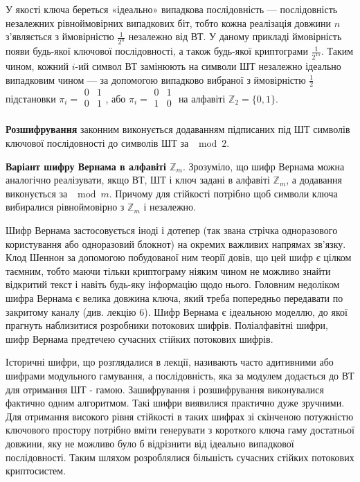 У якості ключа береться «ідеально» випадкова послідовність ---
послідовність незалежних рівноймовірних випадкових біт, тобто кожна
реалізація довжини $n$ з'являється з ймовірністю $\frac{1}{2^n}$ незалежно від ВТ. У
даному прикладі ймовірність появи будь-якої ключової послідовності, а
також будь-якої криптограми $\frac{1}{2^{15}}$. Таким чином, кожний $i$-ий символ ВТ
замінюють на символи ШТ незалежно ідеально випадковим чином --- за
допомогою випадково вибраної з ймовірністю $\frac{1}{2}$ підстановки
$\pi_i = \begin{matrix}
    0 & 1 \\
    0 & 1 \\
\end{matrix}$, або $\pi_i = \begin{matrix}
    0 & 1 \\
    1 & 0 \\
\end{matrix}$ на алфавіті $\mathbb{Z}_2 = \{ 0, 1\}$.

\textbf{Розшифрування} законним виконується додаванням підписаних під ШТ
символів ключової послідовності до символів ШТ за $\mod 2$.

\textbf{Варіант шифру Вернама в алфавіті $\mathbb{Z}_m$}. Зрозуміло, що шифр Вернама
можна аналогічно реалізувати, якщо ВТ, ШТ і ключ задані в алфавіті $\mathbb{Z}_m$, а
додавання виконується за $\mod m$. Причому для стійкості потрібно щоб
символи ключа вибиралися рівноймовірно з $\mathbb{Z}_m$ і незалежно.

Шифр Вернама застосовується іноді і дотепер (так звана стрічка
одноразового користування або одноразовий блокнот) на окремих важливих
напрямах зв’язку. Клод Шеннон за допомогою побудованої ним теорії довів,
що цей шифр є цілком таємним, тобто маючи тільки криптограму ніяким
чином не можливо знайти відкритий текст і навіть будь-яку інформацію
щодо нього. Головним недоліком шифра Вернама є велика довжина ключа,
який треба попередньо передавати по закритому каналу (див. лекцію 6).
Шифр Вернама є ідеальною моделлю, до якої прагнуть наблизитися
розробники потокових шифрів. Поліалфавітні шифри, шифр Вернама
предтечею сучасних стійких потокових шифрів.

Історичні шифри, що розглядалися в лекції, називають часто
адитивними або шифрами модульного гамування, а послідовність, яка за
модулем додається до ВТ для отримання ШТ - гамою. Зашифрування і
розшифрування виконувалися фактично одним алгоритмом. Такі шифри
виявилися практично дуже зручними. Для отримання високого рівня
стійкості в таких шифрах зі скінченою потужністю ключового простору
потрібно вміти генерувати з короткого ключа гаму достатньої довжини, яку
не можливо було б відрізнити від ідеально випадкової послідовності. Таким
шляхом розроблялися більшість сучасних стійких потокових криптосистем.

